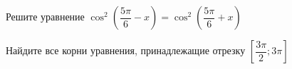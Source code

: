 \begin{ex}
	\begin{condition}
		\begin{enumcols}[label=\asbuk*)]
			\item Решите уравнение \(  \cos^2{\left(\dfrac{5\pi}{6} - x\right)}=\cos^2{\left(\dfrac{5\pi}{6} + x\right)} \)
			\item Найдите все корни уравнения, принадлежащие отрезку \( \left[\dfrac{3\pi}{2};3\pi\right] \)
		\end{enumcols}
	\end{condition}
\end{ex}